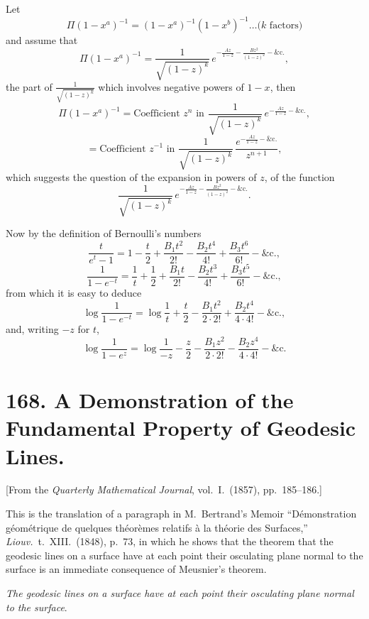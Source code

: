 \documentclass[11pt,a4paper]{book}
\begin{document}
Let
\[
\Pi(1-x^a)^{-1} = (1-x^a)^{-1}(1-x^b)^{-1}\ldots\text{($k$ factors)}
\]
and assume that
\[
\Pi(1-x^a)^{-1} = \frac{1}{\sqrt{(1-z)^k}}\, e^{-\frac{Az}{1-z}-\frac{Bz^2}{(1-z)^2}-\&\text{c.}},
\]
the part of $\frac{1}{\sqrt{(1-z)^k}}$ which involves negative powers of $1-x$, then
\[
\Pi(1-x^a)^{-1} = \text{Coefficient } z^n \text{ in } \frac{1}{\sqrt{(1-z)^k}}\, e^{-\frac{Az}{1-z}-\&\text{c.}},
\]
\[
= \text{Coefficient } z^{-1} \text{ in } \frac{1}{\sqrt{(1-z)^k}}\, \frac{e^{-\frac{Az}{1-z}-\&\text{c.}}}{z^{n+1}},
\]
which suggests the question of the expansion in powers of $z$, of the function
\[
\frac{1}{\sqrt{(1-z)^k}}\, e^{-\frac{Az}{1-z}-\frac{Bz^2}{(1-z)^2}-\&\text{c.}}.
\]

Now by the definition of Bernoulli's numbers
\[
\frac{t}{e^t-1} = 1 - \frac{t}{2} + \frac{B_1 t^2}{2!} - \frac{B_2 t^4}{4!} + \frac{B_3 t^6}{6!} - \&\text{c.},
\]
\[
\frac{1}{1-e^{-t}} = \frac{1}{t} + \frac{1}{2} + \frac{B_1 t}{2!} - \frac{B_2 t^3}{4!} + \frac{B_3 t^5}{6!} - \&\text{c.},
\]
from which it is easy to deduce
\[
\log\frac{1}{1-e^{-t}} = \log\frac{1}{t} + \frac{t}{2} - \frac{B_1 t^2}{2 \cdot 2!} + \frac{B_2 t^4}{4 \cdot 4!} - \&\text{c.},
\]
and, writing $-z$ for $t$,
\[
\log\frac{1}{1-e^{z}} = \log\frac{1}{-z} - \frac{z}{2} - \frac{B_1 z^2}{2 \cdot 2!} - \frac{B_2 z^4}{4 \cdot 4!} - \&\text{c.}
\]


\newpage
\section*{168. A Demonstration of the Fundamental Property of Geodesic Lines.}

[From the \textit{Quarterly Mathematical Journal}, vol.~I.~(1857), pp.~185--186.]

This is the translation of a paragraph in M.~Bertrand's Memoir ``D\'emonstration g\'eom\'etrique de quelques th\'eor\`emes relatifs \`a la th\'eorie des Surfaces,'' \textit{Liouv.}\ t.~XIII.~(1848), p.~73, in which he shows that the theorem that the geodesic lines on a surface have at each point their osculating plane normal to the surface is an immediate consequence of Meusnier's theorem.

\textit{The geodesic lines on a surface have at each point their osculating plane normal to the surface}.
\end{document}
